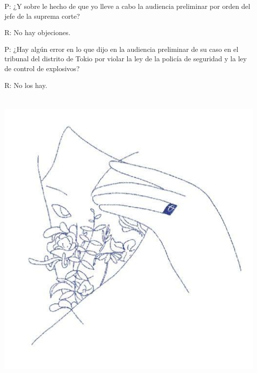 \documentclass[
]{book}
\begin{document}
P: ¿Y sobre le hecho de que yo lleve a cabo la audiencia preliminar por orden del jefe de la suprema corte?

R: No hay objeciones.

P: ¿Hay algún error en lo que dijo en la audiencia preliminar de su caso en el tribunal del distrito de Tokio por violar la ley de la policía de seguridad y la ley de control de explosivos?

R: No los hay.

\hypertarget{section-2}{%
\chapter*{}\label{section-2}}

\includegraphics{images/contra.jpg}

  
\end{document}
